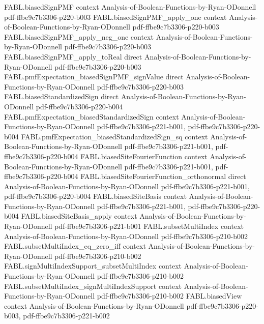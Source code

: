 \begin{theorem}
\proofstep
  {FABL.biasedSignPMF}
  {context}
  {Analysis-of-Boolean-Functions-by-Ryan-ODonnell}
  {pdf-ffbe9c7b3306-p220-b003}
\proofstep
  {FABL.biasedSignPMF_apply_one}
  {context}
  {Analysis-of-Boolean-Functions-by-Ryan-ODonnell}
  {pdf-ffbe9c7b3306-p220-b003}
\proofstep
  {FABL.biasedSignPMF_apply_neg_one}
  {context}
  {Analysis-of-Boolean-Functions-by-Ryan-ODonnell}
  {pdf-ffbe9c7b3306-p220-b003}
\proofstep
  {FABL.biasedSignPMF_apply_toReal}
  {direct}
  {Analysis-of-Boolean-Functions-by-Ryan-ODonnell}
  {pdf-ffbe9c7b3306-p220-b003}
\proofstep
  {FABL.pmfExpectation_biasedSignPMF_signValue}
  {direct}
  {Analysis-of-Boolean-Functions-by-Ryan-ODonnell}
  {pdf-ffbe9c7b3306-p220-b003}
\proofstep
  {FABL.biasedStandardizedSign}
  {direct}
  {Analysis-of-Boolean-Functions-by-Ryan-ODonnell}
  {pdf-ffbe9c7b3306-p220-b004}
\proofstep
  {FABL.pmfExpectation_biasedStandardizedSign}
  {context}
  {Analysis-of-Boolean-Functions-by-Ryan-ODonnell}
  {pdf-ffbe9c7b3306-p221-b001,
    pdf-ffbe9c7b3306-p220-b004}
\proofstep
  {FABL.pmfExpectation_biasedStandardizedSign_sq}
  {context}
  {Analysis-of-Boolean-Functions-by-Ryan-ODonnell}
  {pdf-ffbe9c7b3306-p221-b001,
    pdf-ffbe9c7b3306-p220-b004}
\proofstep
  {FABL.biasedSiteFourierFunction}
  {context}
  {Analysis-of-Boolean-Functions-by-Ryan-ODonnell}
  {pdf-ffbe9c7b3306-p221-b001,
    pdf-ffbe9c7b3306-p220-b004}
\proofstep
  {FABL.biasedSiteFourierFunction_orthonormal}
  {direct}
  {Analysis-of-Boolean-Functions-by-Ryan-ODonnell}
  {pdf-ffbe9c7b3306-p221-b001,
    pdf-ffbe9c7b3306-p220-b004}
\proofstep
  {FABL.biasedSiteBasis}
  {context}
  {Analysis-of-Boolean-Functions-by-Ryan-ODonnell}
  {pdf-ffbe9c7b3306-p221-b001,
    pdf-ffbe9c7b3306-p220-b004}
\proofstep
  {FABL.biasedSiteBasis_apply}
  {context}
  {Analysis-of-Boolean-Functions-by-Ryan-ODonnell}
  {pdf-ffbe9c7b3306-p221-b001}
\proofstep
  {FABL.subsetMultiIndex}
  {context}
  {Analysis-of-Boolean-Functions-by-Ryan-ODonnell}
  {pdf-ffbe9c7b3306-p210-b002}
\proofstep
  {FABL.subsetMultiIndex_eq_zero_iff}
  {context}
  {Analysis-of-Boolean-Functions-by-Ryan-ODonnell}
  {pdf-ffbe9c7b3306-p210-b002}
\proofstep
  {FABL.signMultiIndexSupport_subsetMultiIndex}
  {context}
  {Analysis-of-Boolean-Functions-by-Ryan-ODonnell}
  {pdf-ffbe9c7b3306-p210-b002}
\proofstep
  {FABL.subsetMultiIndex_signMultiIndexSupport}
  {context}
  {Analysis-of-Boolean-Functions-by-Ryan-ODonnell}
  {pdf-ffbe9c7b3306-p210-b002}
\proofstep
  {FABL.biasedView}
  {context}
  {Analysis-of-Boolean-Functions-by-Ryan-ODonnell}
  {pdf-ffbe9c7b3306-p220-b003,
    pdf-ffbe9c7b3306-p221-b002}
\proofstep

\end{theorem}
